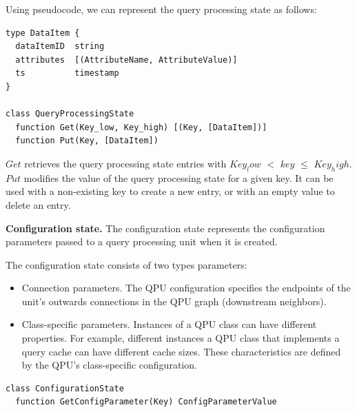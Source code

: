 Using pseudocode, we can represent the query processing state as follows:

\begin{lstlisting}[caption={Pseudocode for the QPU's query processing state},captionpos=b,label={lst:qpustate}]
type DataItem {
  dataItemID  string
  attributes  [(AttributeName, AttributeValue)]
  ts          timestamp
}

class QueryProcessingState
  function Get(Key_low, Key_high) [(Key, [DataItem])]
  function Put(Key, [DataItem])
\end{lstlisting}

$Get$ retrieves the query processing state entries with $Key_low$ $<$ $key$ $\leq$ $Key_high$.
$Put$ modifies the value of the query processing state for a given key.
It can be used with a non-existing key to create a new entry, or with an empty value to delete an entry.

\medskip
\noindent
\textbf{Configuration state.}
The configuration state represents the configuration parameters passed to a query processing unit when it is created.

The configuration state consists of two types parameters:
\begin{itemize}
  \item Connection parameters.
  The QPU configuration specifies the endpoints of the unit's outwards connections in the QPU graph (downstream neighbors).

  \item Class-specific parameters.
  Instances of a QPU class can have different properties.
  For example, different instances a QPU class that implements a query cache can have different cache sizes.
  These characteristics are defined by the QPU's class-specific configuration.

\end{itemize}

\begin{lstlisting}[caption={Pseudocode for the QPU's configuration state},captionpos=b,label={lst:qpuconfigstate}]
class ConfigurationState
  function GetConfigParameter(Key) ConfigParameterValue
\end{lstlisting}


